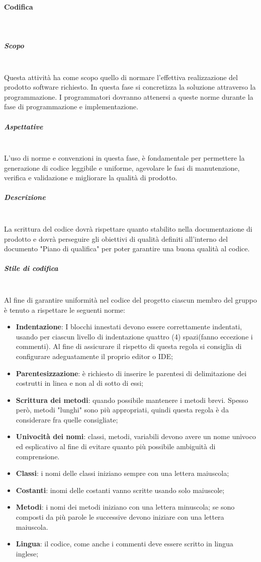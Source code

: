 \paragraph{Codifica} \mbox{}\\
\subparagraph{Scopo} \mbox{}\\
Questa attività ha come scopo quello di normare l’effettiva realizzazione del prodotto software richiesto. In questa fase si concretizza la soluzione attraverso la programmazione. I programmatori dovranno attenersi a queste norme durante la fase di programmazione e implementazione.
\subparagraph{Aspettative} \mbox{}\\
L’uso di norme e convenzioni in questa fase, è fondamentale per permettere la generazione di codice leggibile e uniforme,  agevolare le fasi di manutenzione,  verifica e validazione e migliorare la qualità di prodotto.
\subparagraph{Descrizione} \mbox{}\\
La scrittura del codice dovrà rispettare quanto stabilito nella documentazione di prodotto e dovrà perseguire gli obiettivi di qualità definiti all’interno del documento "Piano di qualifica" per poter garantire una buona qualità al codice.
\subparagraph{Stile di codifica} \mbox{}\\
Al fine di garantire uniformità nel codice del progetto ciascun membro del gruppo è
tenuto a rispettare le seguenti norme:
\begin{itemize}
	\item \textbf{Indentazione}: I blocchi innestati devono essere correttamente indentati, usando per ciascun livello di indentazione quattro (4) spazi(fanno eccezione i commenti). Al fine di assicurare il rispetto di questa regola si consiglia di configurare adeguatamente il proprio editor o IDE; %
	\item \textbf{Parentesizzazione}: è richiesto di inserire le parentesi di delimitazione dei costrutti in linea e non al di sotto di essi;
	\item \textbf{Scrittura dei metodi}: quando possibile mantenere i metodi brevi. Spesso però, metodi "lunghi" sono più appropriati, quindi questa regola è da considerare fra quelle consigliate;
	\item \textbf{Univocità dei nomi}: classi, metodi, variabili devono avere un nome univoco	ed esplicativo al fine di evitare quanto più possibile ambiguità di comprensione.
	\item \textbf{Classi}: i nomi delle classi iniziano sempre con una lettera maiuscola;
	\item \textbf{Costanti}: inomi delle costanti vanno scritte usando solo maiuscole;
	\item \textbf{Metodi}: i nomi dei metodi iniziano con una lettera minuscola;
	se sono composti da più parole le successive devono iniziare con una lettera
	maiuscola.
	\item \textbf{Lingua}: il codice, come anche i commenti deve essere scritto in lingua inglese;
\end{itemize}

